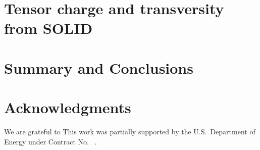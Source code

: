 \documentclass[twocolumn,showpacs,preprintnumbers,amsmath,amssymb,floatfix,prd]{revtex4}
\newcommand*{\BibPath}{.}%
\begin{document}
 
\section{Tensor charge and transversity from SOLID}

\section{Summary and Conclusions}
%
 

\section*{Acknowledgments}
%
We are grateful to  
This work was partially supported by   the
U.S.\ Department of Energy under Contract No.~ .


 
\end{document}
